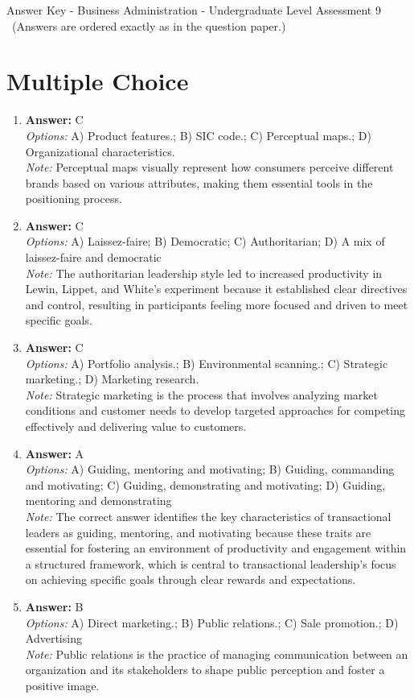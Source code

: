\documentclass[12pt]{article}
\begin{document}
\begin{center}
Answer Key - Business Administration - Undergraduate Level Assessment 9 \
\small (Answers are ordered exactly as in the question paper.)
\end{center}

\section*{Multiple Choice}
\begin{enumerate}[label=\arabic*.]
\item \textbf{Answer:} C
\\ \textit{Options:} A) Product features.; B) SIC code.; C) Perceptual maps.; D) Organizational characteristics.
\\ \textit{Note:} Perceptual maps visually represent how consumers perceive different brands based on various attributes, making them essential tools in the positioning process.
\item \textbf{Answer:} C
\\ \textit{Options:} A) Laissez-faire; B) Democratic; C) Authoritarian; D) A mix of laissez-faire and democratic
\\ \textit{Note:} The authoritarian leadership style led to increased productivity in Lewin, Lippet, and White's experiment because it established clear directives and control, resulting in participants feeling more focused and driven to meet specific goals.
\item \textbf{Answer:} C
\\ \textit{Options:} A) Portfolio analysis.; B) Environmental scanning.; C) Strategic marketing.; D) Marketing research.
\\ \textit{Note:} Strategic marketing is the process that involves analyzing market conditions and customer needs to develop targeted approaches for competing effectively and delivering value to customers.
\item \textbf{Answer:} A
\\ \textit{Options:} A) Guiding, mentoring and motivating; B) Guiding, commanding and motivating; C) Guiding, demonstrating and motivating; D) Guiding, mentoring and demonstrating
\\ \textit{Note:} The correct answer identifies the key characteristics of transactional leaders as guiding, mentoring, and motivating because these traits are essential for fostering an environment of productivity and engagement within a structured framework, which is central to transactional leadership's focus on achieving specific goals through clear rewards and expectations.
\item \textbf{Answer:} B
\\ \textit{Options:} A) Direct marketing.; B) Public relations.; C) Sale promotion.; D) Advertising
\\ \textit{Note:} Public relations is the practice of managing communication between an organization and its stakeholders to shape public perception and foster a positive image.
\end{enumerate}
\end{document}
